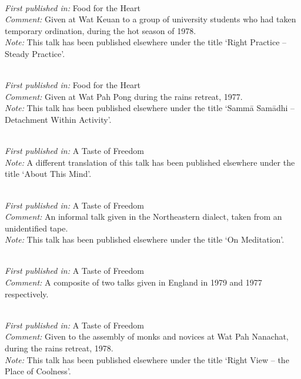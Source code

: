 { \\
\textit{First published in:} Food for the Heart \\
\textit{Comment:} Given at Wat Keuan to a group of university students who had taken temporary ordination, during the hot season of 1978. \\
\textit{Note:} This talk has been published elsewhere under the title `Right Practice -- Steady Practice'.

\clearpage

 \\
\textit{First published in:} Food for the Heart \\
\textit{Comment:} Given at Wat Pah Pong during the rains retreat, 1977. \\
\textit{Note:} This talk has been published elsewhere under the title `Samm\={a} Sam\={a}dhi -- Detachment Within Activity'.

 \\
\textit{First published in:} A Taste of Freedom \\
\textit{Note:} A different translation of this talk has been published elsewhere under the title `About This Mind'.

 \\
\textit{First published in:} A Taste of Freedom \\
\textit{Comment:} An informal talk given in the Northeastern dialect, taken from an unidentified tape. \\
\textit{Note:} This talk has been published elsewhere under the title `On Meditation'.

 \\
\textit{First published in:} A Taste of Freedom \\
\textit{Comment:} A composite of two talks given in England in 1979 and 1977 respectively.

 \\
\textit{First published in:} A Taste of Freedom \\
\textit{Comment:} Given to the assembly of monks and novices at Wat Pah Nanachat, during the rains retreat, 1978. \\
\textit{Note:} This talk has been published elsewhere under the title `Right View -- the Place of Coolness'.

\clearpage

}
